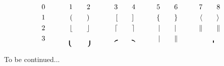 \documentclass[a4paper]{report}
\begin{document}
\begin{displaymath}
\begin{aligned}
& 0 \qquad& 1 \qquad& 2 \qquad& 3 \qquad& 4 \qquad& 5 \qquad& 6 \qquad& 7 \qquad& 8\\
& 1 \qquad& ( \qquad& ) \qquad& \lbrack \qquad& \rbrack \qquad& \lbrace \qquad&
\rbrace \qquad& \langle \qquad& \rangle\\
& 2 \qquad& \lfloor \qquad& \rfloor \qquad& \lceil \qquad& \rceil \qquad& \vert
\qquad& | \qquad& \Vert \qquad& \|\\
& 3 \qquad& \lgroup \qquad& \rgroup \qquad& \lmoustache \qquad& \rmoustache \qquad&
\arrowvert \qquad& \Arrowvert \qquad& \bracevert
\end{aligned}
\end{displaymath}

To be continued...
\end{document}
